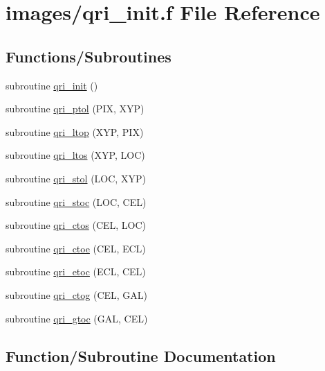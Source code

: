 \hypertarget{qri__init_8f}{}\section{images/qri\+\_\+init.f File Reference}
\label{qri__init_8f}
\subsection*{Functions/\+Subroutines}
\begin{DoxyCompactItemize}
\item 
subroutine \hyperlink{qri__init_8f_a5f65eb7c0a4007a53e262b20744dd277}{qri\+\_\+init} ()
\item 
subroutine \hyperlink{qri__init_8f_a70637518ae19a768e868a4235c667703}{qri\+\_\+ptol} (P\+IX, X\+YP)
\item 
subroutine \hyperlink{qri__init_8f_a2e089c76ba6463c7081fb26ecb5fc55f}{qri\+\_\+ltop} (X\+YP, P\+IX)
\item 
subroutine \hyperlink{qri__init_8f_a32b9e76d54937342c2d26dfa7d2638ab}{qri\+\_\+ltos} (X\+YP, L\+OC)
\item 
subroutine \hyperlink{qri__init_8f_accf819b4c65f65f7a02b0e843c293f4a}{qri\+\_\+stol} (L\+OC, X\+YP)
\item 
subroutine \hyperlink{qri__init_8f_ae668fbb113c1d6d90dfa9cefc880d9c8}{qri\+\_\+stoc} (L\+OC, C\+EL)
\item 
subroutine \hyperlink{qri__init_8f_a69d1cfcdc3af438747cc3eba6e84f177}{qri\+\_\+ctos} (C\+EL, L\+OC)
\item 
subroutine \hyperlink{qri__init_8f_a39582a738b6e0bc629e5bdfa0adba30d}{qri\+\_\+ctoe} (C\+EL, E\+CL)
\item 
subroutine \hyperlink{qri__init_8f_a354a3d1e1dafab02a592ab49244ee4d8}{qri\+\_\+etoc} (E\+CL, C\+EL)
\item 
subroutine \hyperlink{qri__init_8f_abfa2508656ae8d72e8b83dba7ebd1983}{qri\+\_\+ctog} (C\+EL, G\+AL)
\item 
subroutine \hyperlink{qri__init_8f_a21aca6ff94b837a90ea7c3a6e37b7202}{qri\+\_\+gtoc} (G\+AL, C\+EL)
\end{DoxyCompactItemize}


\subsection{Function/\+Subroutine Documentation}
\mbox{\label{qri__init_8f_a39582a738b6e0bc629e5bdfa0adba30d}} 
